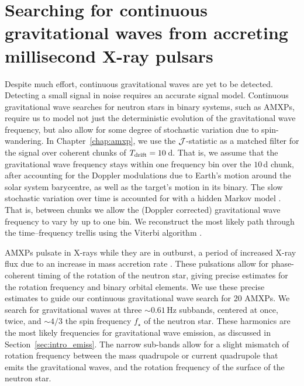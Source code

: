 \section[Searching for continuous gravitational waves from accreting millisecond X-ray pulsars]{Searching for continuous gravitational waves \linebreak from accreting millisecond X-ray pulsars} \label{sec:concl_amxp}
Despite much effort, continuous gravitational waves are yet to be detected. Detecting a small signal in noise requires an accurate signal model. Continuous gravitational wave searches for neutron stars in binary systems, such as AMXPs, require us to model not just the deterministic evolution of the gravitational wave frequency, but also allow for some degree of stochastic variation due to spin-wandering. In Chapter~\ref{chap:amxp}, we use the $\mathcal{J}$-statistic \citep{Suvorova2017} as a matched filter for the signal over coherent chunks of $T_{\rm drift} = 10\,$d. That is, we assume that the gravitational wave frequency stays within one frequency bin over the $10\,$d chunk, after accounting for the Doppler modulations due to Earth's motion around the solar system barycentre, as well as the target's motion in its binary. The slow stochastic variation over time is accounted for with a hidden Markov model \citep{Suvorova2016}. That is, between chunks we allow the (Doppler corrected) gravitational wave frequency to vary by up to one bin. We reconstruct the most likely path through the time--frequency trellis using the Viterbi algorithm \citep{Viterbi1967}. 

AMXPs pulsate in X-rays while they are in outburst, a period of increased X-ray flux due to an increase in mass accretion rate \citep{DiSalvo2022}. These pulsations allow for phase-coherent timing of the rotation of the neutron star, giving precise estimates for the rotation frequency and binary orbital elements. We use these precise estimates to guide our continuous gravitational wave search for 20 AMXPs. We search for gravitational waves at three $\sim0.61\,$Hz subbands, centered at once, twice, and $\sim4/3$ the spin frequency $f_\star$ of the neutron star. These harmonics are the most likely frequencies for gravitational wave emission, as discussed in Section~\ref{sec:intro_emiss}. The narrow sub-bands allow for a slight mismatch of rotation frequency between the mass quadrupole or current quadrupole that emits the gravitational waves, and the rotation frequency of the surface of the neutron star.


